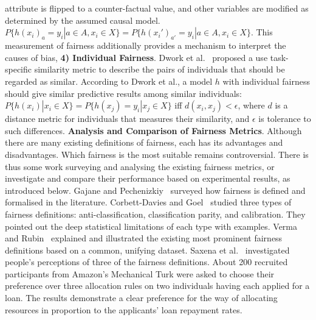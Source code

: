 attribute is flipped to a counter-factual value, and other variables are modified as determined by the assumed causal model.
$P\{h(x_i)_{a}=y_i|a\in A,x_i \in X\} = P\{h(x_i')_{a'}=y_i|a \in A,x_i \in X\}$.
This measurement of fairness additionally provides a mechanism to interpret the causes of bias, 
\noindent \textbf{4) Individual Fairness}.
Dwork et al.~ proposed a use task-specific similarity metric to describe the pairs of individuals that should be regarded as similar. 
According to Dwork et al., a model $h$ with individual fairness should give similar predictive results among similar individuals: $P\{h(x_i)|x_i \in X\} = P\{h(x_j)=y_i|x_j \in X\}$ iff $d(x_i,x_j)<\epsilon$, where $d$ is a distance metric for individuals that measures their similarity, and $\epsilon$ is tolerance to such differences.
\noindent \textbf{Analysis and Comparison of Fairness Metrics}.
Although there are many existing definitions of fairness, each has its advantages and disadvantages.
Which fairness is the most suitable remains controversial.
There is thus some work surveying and analysing the existing fairness metrics, or investigate and compare their performance based on experimental results, as introduced below.
Gajane and Pechenizkiy~ surveyed how fairness is defined and formalised in the literature.
Corbett-Davies and Goel~ studied three types of fairness definitions: anti-classification, classification parity, and calibration.
They pointed out the deep statistical limitations of each type with examples.
Verma and Rubin~ explained and illustrated the existing most prominent fairness definitions based on a common, unifying dataset.
Saxena et al.~ investigated people's perceptions of three of the fairness definitions. 
About 200 recruited participants from Amazon's Mechanical Turk were asked to choose their preference over three allocation rules on two individuals having each applied for a loan. 
The results demonstrate a clear preference for the way of allocating resources in proportion to the applicants' loan repayment rates.
\noindent \textbf{}
